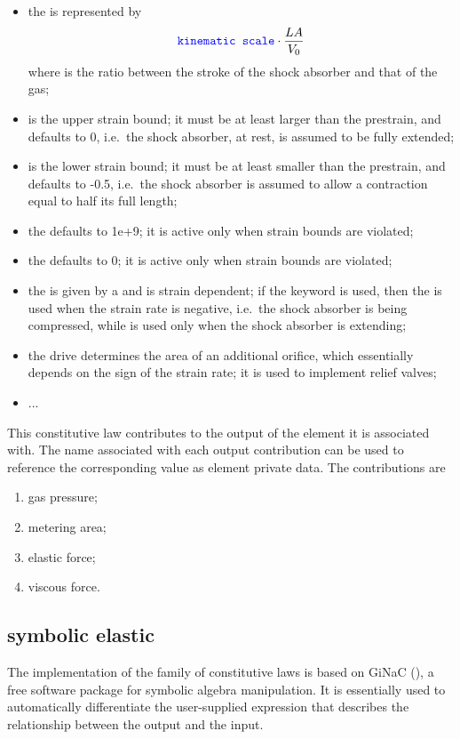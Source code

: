 \begin{itemize}
\item the  is represented by
\begin{displaymath}
	\textcolor{blue}{\texttt{kinematic scale}} \cdot \frac{L A}{V_0}
\end{displaymath}
where  is the ratio between the stroke
of the shock absorber and that of the gas;
\item {} is the upper strain bound; it must be
at least larger than the prestrain, and defaults to 0,
i.e.\ the shock absorber, at rest, is assumed to be fully
extended;
\item {} is the lower strain bound; it must be
at least smaller than the prestrain, and defaults to -0.5, 
i.e.\ the shock absorber is assumed to allow a contraction
equal to half its full length;
\item the  defaults to 1e+9;
it is active only when strain bounds are violated;
\item the  defaults to 0;
it is active only when strain bounds are violated;
\item the  is given by a  
and is strain dependent; if the keyword  is used, 
then the  is used
when the strain rate is negative, i.e.\ the shock absorber
is being compressed, while  is used only
when the shock absorber is extending;
\item the  drive determines the area of an
additional orifice, which essentially depends on the sign
of the strain rate; it is used to implement relief valves;
\item ...
\end{itemize}
This constitutive law contributes to the output of the element
it is associated with.
The name associated with each output contribution can be used to reference
the corresponding value as element private data.
The contributions are
\begin{enumerate}
\item {} gas pressure;
\item {} metering area;
\item {} elastic force;
\item {} viscous force.
\end{enumerate}

\subsection{symbolic elastic}\label{sec:CL:SYMBOLIC-ELASTIC}
The implementation  of the family of  constitutive laws
is based on GiNaC 
(),
a free software package for symbolic algebra manipulation.
It is essentially used to automatically differentiate
the user-supplied expression that describes the relationship
between the output and the input.

